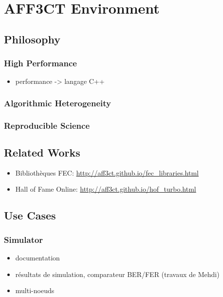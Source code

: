 \chapter{AFF3CT Environment}

\section{Philosophy~\cite{Cassagne2019a}}

\subsection{High Performance}

\begin{itemize}
  \item performance -> langage C++
\end{itemize}

\subsection{Algorithmic Heterogeneity}

\subsection{Reproducible Science}

\section{Related Works}

\begin{itemize}
  \item Bibliothèques FEC: \url{http://aff3ct.github.io/fec_libraries.html}
  \item Hall of Fame Online: \url{http://aff3ct.github.io/hof_turbo.html}
\end{itemize}

\section{Use Cases}

\subsection{Simulator~\cite{Cassagne2017,Cassagne2017a}}

\begin{itemize}
  \item documentation
  \item résultats de simulation, comparateur BER/FER (travaux de Mehdi)
  \item multi-noeuds
\end{itemize}

